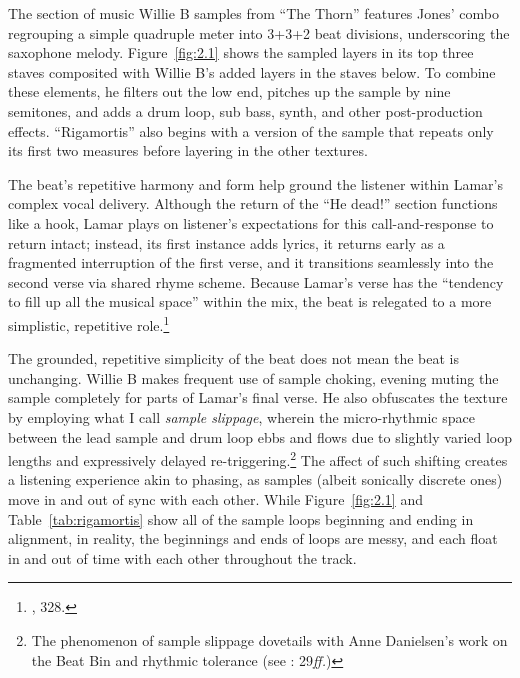 The section of music Willie B samples from ``The Thorn'' features Jones' combo regrouping a simple quadruple meter into 3+3+2 beat divisions, underscoring the saxophone melody. Figure~\ref{fig:2.1} shows the sampled layers in its top three staves composited with Willie B's added layers in the staves below. To combine these elements, he filters out the low end, pitches up the sample by nine semitones, and adds a drum loop, sub bass, synth, and other post-production effects. ``Rigamortis'' also begins with a version of the sample that repeats only its first two measures before layering in the other textures.

The beat's repetitive harmony and form help ground the listener within Lamar's complex vocal delivery. Although the return of the ``He dead!'' section functions like a hook, Lamar plays on listener's expectations for this call-and-response to return intact; instead, its first instance adds lyrics, it returns early as a fragmented interruption of the first verse, and it transitions seamlessly into the second verse via shared rhyme scheme. Because Lamar's verse has the ``tendency to fill up all the musical space'' within the mix,  the beat is relegated to a more simplistic, repetitive role.\footnote{\cite{ollywilsonHeterogeneousSoundIdeal1992}, 328.}

The grounded, repetitive simplicity of the beat does not mean the beat is unchanging. Willie B makes frequent use of sample choking, evening muting the sample completely for parts of Lamar's final verse. He also obfuscates the texture by employing what I call \emph{sample slippage}, wherein the micro-rhythmic space between the lead sample and drum loop ebbs and flows due to slightly varied loop lengths and expressively delayed re-triggering.\footnote{The phenomenon of sample slippage dovetails with Anne Danielsen's work on the Beat Bin and rhythmic tolerance (see \cite{annedanielsenHereThereEverywhere2016}: 29\textit{ff.})} The affect of such shifting creates a listening experience akin to phasing, as samples (albeit sonically discrete ones) move in and out of sync with each other.  While Figure~\ref{fig:2.1} and Table~\ref{tab:rigamortis} show all of the sample loops beginning and ending in alignment, in reality, the beginnings and ends of loops are messy, and each float in and out of time with each other throughout the track.

